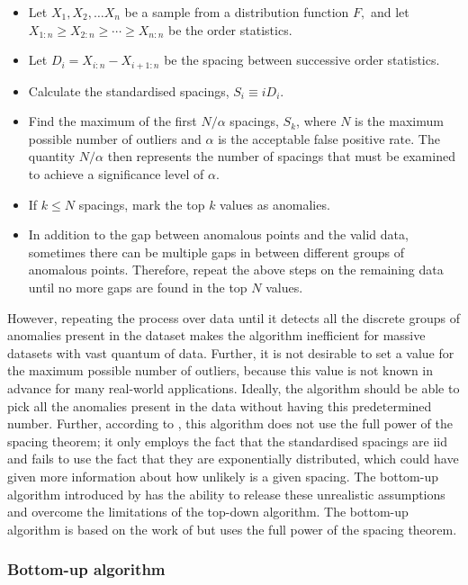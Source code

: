\documentclass{monashthesis}
\theoremstyle{definition}
\theoremstyle{definition}
\theoremstyle{definition}
\theoremstyle{remark}
\begin{document}
\begin{itemize}
\tightlist
\item
  Let \(X_{1},X_{2},\dots X_{n}\) be a sample from a distribution function \(F,\) and let \(X_{1:n}\geqslant X_{2:n}\geqslant \cdots \geqslant X_{n:n}\) be the order statistics.
\item
  Let \(D_{i} = X_{i:n} - X_{i+1:n}\) be the spacing between successive order statistics.
\item
  Calculate the standardised spacings, \(S_{i} \equiv iD_{i}\).
\item
  Find the maximum of the first \(N/\alpha\) spacings, \(S_{k}\), where \(N\) is the maximum possible number of outliers and \(\alpha\) is the acceptable false positive rate. The quantity \(N/\alpha\) then represents the number of spacings that must be examined to achieve a significance level of \(\alpha\).
\item
  If \(k \leq N\) spacings, mark the top \(k\) values as anomalies.
\item
  In addition to the gap between anomalous points and the valid data, sometimes there can be multiple gaps in between different groups of anomalous points. Therefore, repeat the above steps on the remaining data until no more gaps are found in the top \(N\) values.
\end{itemize}

However, repeating the process over data until it detects all the discrete groups of anomalies present in the dataset makes the algorithm inefficient for massive datasets with vast quantum of data. Further, it is not desirable to set a value for the maximum possible number of outliers, because this value is not known in advance for many real-world applications. Ideally, the algorithm should be able to pick all the anomalies present in the data without having this predetermined number. Further, according to \textcite{schwarz2008wind}, this algorithm does not use the full power of the spacing theorem; it only employs the fact that the standardised spacings are iid and fails to use the fact that they are exponentially distributed, which could have given more information about how unlikely is a given spacing. The bottom-up algorithm introduced by \textcite{schwarz2008wind} has the ability to release these unrealistic assumptions and overcome the limitations of the top-down algorithm. The bottom-up algorithm is based on the work of \textcite{burridge2006additive} but uses the full power of the spacing theorem.

\hypertarget{bottom-up-algorithm}{%
\subsubsection{Bottom-up algorithm}\label{bottom-up-algorithm}}
\end{document}
